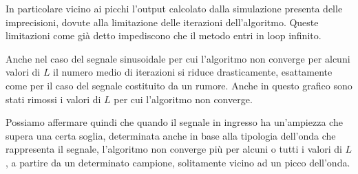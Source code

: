 		In particolare vicino ai picchi l'output calcolato dalla simulazione presenta delle imprecisioni, dovute alla limitazione delle iterazioni dell'algoritmo. Queste limitazioni come già detto impediscono che il metodo entri in loop infinito. %
	
		Anche nel caso del segnale sinusoidale per cui l'algoritmo non converge per alcuni valori di $L$ il numero medio di iterazioni si riduce drasticamente, esattamente come per il caso del segnale costituito da un rumore. Anche in questo grafico sono stati rimossi i valori di $L$ per cui l'algoritmo non converge.
	
	
		Possiamo affermare quindi che quando il segnale in ingresso ha un'ampiezza che supera una certa soglia, determinata anche in base alla tipologia dell'onda che rappresenta il segnale, l'algoritmo non converge più per alcuni o tutti i valori di $L$, a partire da un determinato campione, solitamente vicino ad un picco dell'onda.